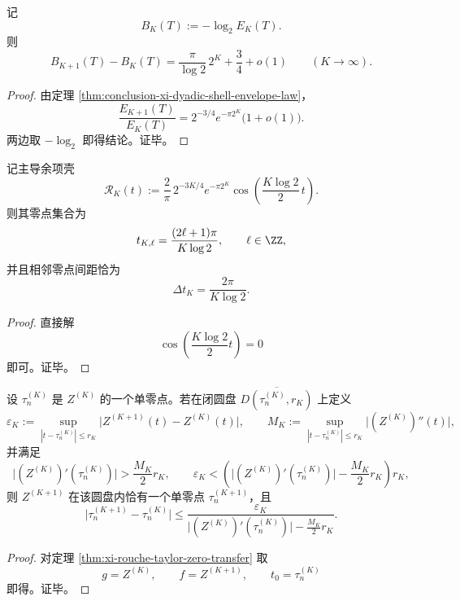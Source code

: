 \begin{corollary}[每增一层的二进制精度收益律]\label{cor:conclusion-xi-dyadic-shell-bit-gain-law}
记
\[
B_K(T):=-\log_2 E_K(T).
\]
则
\[
B_{K+1}(T)-B_K(T)
=
\frac{\pi}{\log 2}\,2^K+\frac34+o(1)
\qquad (K\to\infty).
\]
\end{corollary}
\begin{proof}
由定理 \ref{thm:conclusion-xi-dyadic-shell-envelope-law}，
\[
\frac{E_{K+1}(T)}{E_K(T)}
=
2^{-3/4}e^{-\pi 2^K}\bigl(1+o(1)\bigr).
\]
两边取 \(-\log_2\) 即得结论。证毕。
\end{proof}

\begin{theorem}\label{thm:conclusion-xi-dyadic-shell-zero-lattice}
记主导余项壳
\[
\mathcal R_K(t):=
\frac{2}{\pi}\,2^{-3K/4}e^{-\pi 2^K}
\cos\!\left(\frac{K\log 2}{2}\,t\right).
\]
则其零点集合为
\[
t_{K,\ell}=\frac{(2\ell+1)\pi}{K\log 2},
\qquad \ell\in\ZZ,
\]
并且相邻零点间距恰为
\[
\Delta t_K=\frac{2\pi}{K\log 2}.
\]
\end{theorem}
\begin{proof}
直接解
\[
\cos\!\left(\frac{K\log2}{2}t\right)=0
\]
即可。证毕。
\end{proof}

\begin{theorem}\label{thm:conclusion-xi-adjacent-truncation-rouche-taylor-transport}
设 \(\tau_n^{(K)}\) 是 \(Z^{(K)}\) 的一个单零点。若在闭圆盘 \(\overline{D(\tau_n^{(K)},r_K)}\) 上定义
\[
\varepsilon_K:=
\sup_{|t-\tau_n^{(K)}|\le r_K}\bigl|Z^{(K+1)}(t)-Z^{(K)}(t)\bigr|,
\qquad
M_K:=
\sup_{|t-\tau_n^{(K)}|\le r_K}\bigl|(Z^{(K)})''(t)\bigr|,
\]
并满足
\[
\bigl|(Z^{(K)})'(\tau_n^{(K)})\bigr|>\frac{M_K}{2}r_K,
\qquad
\varepsilon_K<
\left(\bigl|(Z^{(K)})'(\tau_n^{(K)})\bigr|-\frac{M_K}{2}r_K\right)r_K,
\]
则 \(Z^{(K+1)}\) 在该圆盘内恰有一个单零点 \(\tau_n^{(K+1)}\)，且
\[
\bigl|\tau_n^{(K+1)}-\tau_n^{(K)}\bigr|
\le
\frac{\varepsilon_K}{
\bigl|(Z^{(K)})'(\tau_n^{(K)})\bigr|-\frac{M_K}{2}r_K }.
\]
\end{theorem}
\begin{proof}
对定理 \ref{thm:xi-rouche-taylor-zero-transfer} 取
\[
g=Z^{(K)},\qquad f=Z^{(K+1)},\qquad t_0=\tau_n^{(K)}
\]
即得。证毕。
\end{proof}

